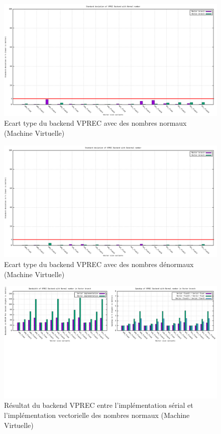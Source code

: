 \documentclass[11pt, letterpaper]{article}
\begin{document}
\label{orgaa7d854}
\begin{figure}[htbp]
\centering
\includegraphics[width=450px]{../ressources/vm_vprec_normal_stddev.png}
\caption{\label{fig:org470bbf6}Ecart type du backend VPREC avec des nombres normaux (Machine Virtuelle)}
\end{figure}

\label{orge0195c2}
\begin{figure}[htbp]
\centering
\includegraphics[width=450px]{../ressources/vm_vprec_denormal_stddev.png}
\caption{\label{fig:org4db983d}Ecart type du backend VPREC avec des nombres dénormaux (Machine Virtuelle)}
\end{figure}

\label{orgd4129df}
\begin{figure}[htbp]
\centering
\includegraphics[width=450px]{../ressources/vm_vprec_serial_vs_vector.png}
\caption{\label{fig:org1104cf2}Résultat du backend VPREC entre l'implémentation sérial et l'implémentation vectorielle des nombres normaux (Machine Virtuelle)}
\end{figure}
\end{document}
